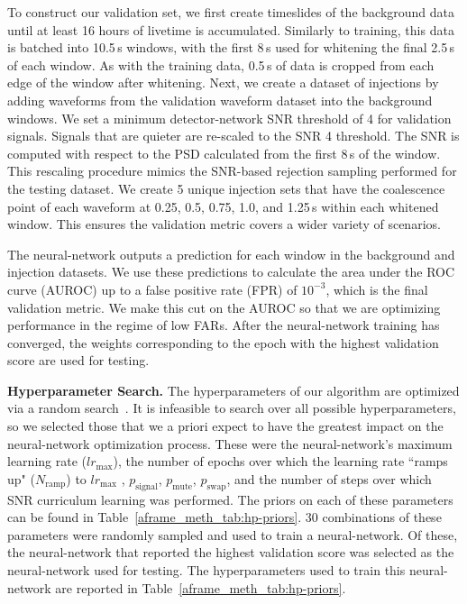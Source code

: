 \begin{refsection}
To construct our validation set, we first create timeslides of the background data until at least 16 hours of livetime is accumulated. 
Similarly to training, this data is batched into 10.5\,s windows, with the first 8\,s used for whitening the final 2.5\,s of each window. 
As with the training data, 0.5\,s of data is cropped from each edge of the window after whitening.
Next, we create a dataset of injections by adding waveforms from the validation waveform dataset into the background windows. 
We set a minimum detector-network SNR threshold of 4 for validation signals. 
Signals that are quieter are re-scaled to the SNR 4 threshold. 
The SNR is computed with respect to the PSD calculated from the first 8\,s of the window. 
This rescaling procedure mimics the SNR-based rejection sampling performed for the testing dataset. 
We create 5 unique injection sets that have the coalescence point of each waveform at 0.25, 0.5, 0.75, 1.0, and 1.25\,s within each whitened window. 
This ensures the validation metric covers a wider variety of scenarios. 

The neural-network outputs a prediction for each window in the background and injection datasets. 
We use these predictions to calculate the area under the ROC curve (AUROC) up to a false positive rate (FPR) of $10^{-3}$, which is the final validation metric. 
We make this cut on the AUROC so that we are optimizing performance in the regime of low FARs. 
After the neural-network training has converged, the weights corresponding to the epoch with the highest validation score are used for testing.


\textbf{Hyperparameter Search.} \label{aframe_meth_sec:hp-search}
The hyperparameters of our algorithm are optimized via a random search~\cite{random_search}. 
It is infeasible to search over all possible hyperparameters, so we selected those that we a priori expect to have the greatest impact on the neural-network optimization process.
These were the neural-network's maximum learning rate ($lr_{\text{max}}$), the number of epochs over which the learning rate ``ramps up" ($N_{\text{ramp}}$) to $lr_{\text{max}}$ , $p_{\text{signal}}$, $p_{\text{mute}}$, $p_{\text{swap}}$, and the number of steps over which SNR curriculum learning was performed. 
The priors on each of these parameters can be found in Table~\ref{aframe_meth_tab:hp-priors}.
30 combinations of these parameters were randomly sampled and used to train a neural-network.
Of these, the neural-network that reported the highest validation score was selected as the neural-network used for testing. 
The hyperparameters used to train this neural-network are reported in Table~\ref{aframe_meth_tab:hp-priors}.


\end{refsection}
